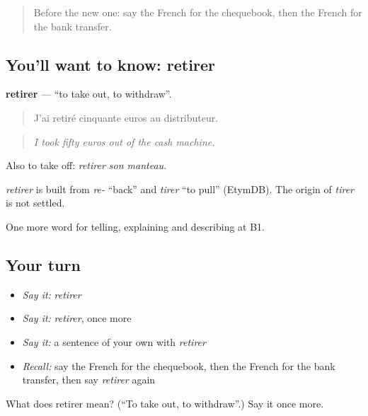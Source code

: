 \begin{quote}
Before the new one: say the French for the chequebook, then the French for the bank transfer.
\end{quote}

\subsection*{You'll want to know: retirer}
\textbf{retirer} — \textquotedblleft{}to take out, to withdraw\textquotedblright{}.

\begin{quote}
J'ai retiré cinquante euros au distributeur.
\end{quote}

\begin{quote}
\emph{I took fifty euros out of the cash machine.}
\end{quote}

Also to take off: \emph{retirer son manteau}.

\begin{cousinweb}
\emph{retirer} is built from \emph{re-} \textquotedblleft{}back\textquotedblright{} and \emph{tirer} \textquotedblleft{}to pull\textquotedblright{} (EtymDB). The origin of \emph{tirer} is not settled.
\end{cousinweb}

\begin{grammarlens}[title={What you've built}]
One more word for telling, explaining and describing at B1.
\end{grammarlens}

\subsection*{Your turn}
\begin{itemize}
\raggedright
  \item \emph{Say it:} \emph{retirer}
  \item \emph{Say it:} \emph{retirer}, once more
  \item \emph{Say it:} a sentence of your own with \emph{retirer}
  \item \emph{Recall:} say the French for the chequebook, then the French for the bank transfer, then say \emph{retirer} again
\end{itemize}

\begin{tcolorbox}[breakable,colback=teal!4,colframe=teal!35!black,title={Before you move on}]
What does retirer mean? (\textquotedblleft{}To take out, to withdraw\textquotedblright{}.) Say it once more.
\end{tcolorbox}

